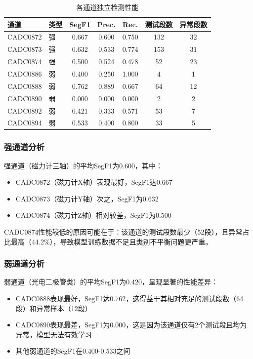 \documentclass[12pt, a4paper]{article}
\begin{document}
\begin{table}[H]
\centering
\caption{各通道独立检测性能}
\label{tab:per_channel}
\begin{tabular}{llccccc}
\toprule
通道 & 类型 & SegF1 & Prec. & Rec. & 测试段数 & 异常段数 \\
\midrule
CADC0872 & 强 & 0.667 & 0.600 & 0.750 & 132 & 32 \\
CADC0873 & 强 & 0.632 & 0.533 & 0.774 & 153 & 31 \\
CADC0874 & 强 & 0.500 & 0.524 & 0.478 & 52 & 23 \\
CADC0886 & 弱 & 0.400 & 0.250 & 1.000 & 4 & 1 \\
CADC0888 & 弱 & 0.762 & 0.889 & 0.667 & 64 & 12 \\
CADC0890 & 弱 & 0.000 & 0.000 & 0.000 & 2 & 2 \\
CADC0892 & 弱 & 0.421 & 0.333 & 0.571 & 53 & 7 \\
CADC0894 & 弱 & 0.533 & 0.400 & 0.800 & 33 & 5 \\
\bottomrule
\end{tabular}
\end{table}

\subsubsection{强通道分析}

强通道（磁力计三轴）的平均SegF1为0.600，其中：
\begin{itemize}
    \item CADC0872（磁力计X轴）表现最好，SegF1达0.667
    \item CADC0873（磁力计Y轴）次之，SegF1为0.632
    \item CADC0874（磁力计Z轴）相对较差，SegF1为0.500
\end{itemize}

CADC0874性能较低的原因可能在于：该通道的测试段数最少（52段），且异常占比最高（44.2\%），导致模型训练数据不足且类别不平衡问题更严重。

\subsubsection{弱通道分析}

弱通道（光电二极管类）的平均SegF1为0.420，呈现显著的性能差异：
\begin{itemize}
    \item CADC0888表现最好，SegF1达0.762，这得益于其相对充足的测试段数（64段）和异常样本（12段）
    \item CADC0890表现最差，SegF1为0.000，这是因为该通道仅有2个测试段且均为异常，模型无法有效学习
    \item 其他弱通道的SegF1在0.400-0.533之间
\end{itemize}
\end{document}
